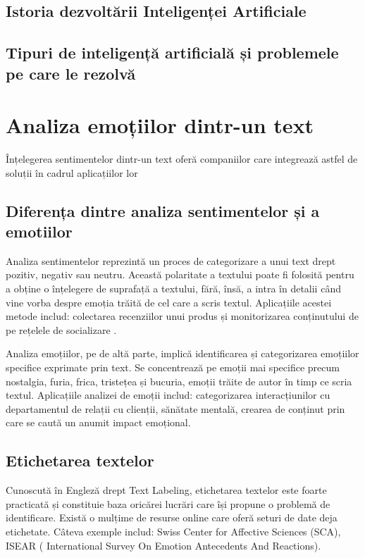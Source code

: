 \documentclass[conference]{IEEEtran}
\begin{document}
\subsection{Istoria dezvoltării Inteligenței Artificiale}

\subsection{Tipuri de inteligență artificială și problemele pe care le rezolvă}

\section{Analiza emoțiilor dintr-un text }
Înțelegerea sentimentelor dintr-un text oferă companiilor care integrează astfel de soluții 
în cadrul aplicațiilor lor 
\subsection{Diferența dintre analiza sentimentelor și a emotiilor}
Analiza sentimentelor reprezintă un proces de categorizare a unui text drept pozitiv, negativ sau neutru.
Această polaritate a textului poate fi folosită pentru a obține o înțelegere de suprafață a textului,
fără, însă, a intra în detalii când vine vorba despre emoția trăită de cel care a scris textul.
Aplicațiile acestei metode includ: colectarea recenziilor unui produs și monitorizarea conținutului de 
pe rețelele de socializare \cite{mc90} .

Analiza emoțiilor, pe de altă parte, implică identificarea și categorizarea emoțiilor specifice exprimate prin text.
Se concentrează pe emoții mai specifice precum nostalgia, furia, frica, tristețea și bucuria, emoții trăite de autor 
în timp ce scria textul. Aplicațiile analizei de emoții includ: 
categorizarea interacțiunilor cu departamentul de relații cu clienții, sănătate mentală, crearea de conținut 
prin care se caută un anumit impact emoțional.


\subsection{Etichetarea textelor}
Cunoscută în Engleză drept Text Labeling, etichetarea textelor este foarte practicată și constituie
baza oricărei lucrări care își propune o problemă de identificare.
Există o mulțime de resurse online care oferă seturi de date deja etichetate.
Câteva exemple includ: Swiss Center for Affective Sciences (SCA), ISEAR ( International Survey On Emotion Antecedents And Reactions).
\end{document}
